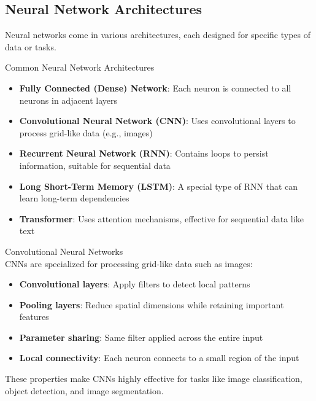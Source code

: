 \subsection{Neural Network Architectures}

Neural networks come in various architectures, each designed for specific types of data or tasks.

\begin{definition}{Common Neural Network Architectures}\\
\begin{itemize}
    \item \textbf{Fully Connected (Dense) Network}: Each neuron is connected to all neurons in adjacent layers
    \item \textbf{Convolutional Neural Network (CNN)}: Uses convolutional layers to process grid-like data (e.g., images)
    \item \textbf{Recurrent Neural Network (RNN)}: Contains loops to persist information, suitable for sequential data
    \item \textbf{Long Short-Term Memory (LSTM)}: A special type of RNN that can learn long-term dependencies
    \item \textbf{Transformer}: Uses attention mechanisms, effective for sequential data like text
\end{itemize}
\end{definition}

\begin{concept}{Convolutional Neural Networks}\\
CNNs are specialized for processing grid-like data such as images:
\begin{itemize}
    \item \textbf{Convolutional layers}: Apply filters to detect local patterns
    \item \textbf{Pooling layers}: Reduce spatial dimensions while retaining important features
    \item \textbf{Parameter sharing}: Same filter applied across the entire input
    \item \textbf{Local connectivity}: Each neuron connects to a small region of the input
\end{itemize}
These properties make CNNs highly effective for tasks like image classification, object detection, and image segmentation.
\end{concept}

